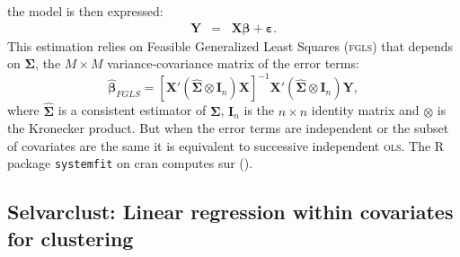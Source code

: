 \documentclass[12pt,a4paper]{report}
\begin{document}
		the model is then expressed:
		\begin{eqnarray}
			\boldsymbol{Y}%
			&=&\boldsymbol{X}\boldsymbol{\beta}+\boldsymbol{\varepsilon}. \nonumber
		\end{eqnarray}
		 This estimation relies on Feasible Generalized Least Squares (\textsc{fgls}) that depends on $\boldsymbol{\Sigma}$, the $M \times M$ variance-covariance matrix of the error terms:
		 \begin{equation}
		 	\hat{\boldsymbol{\beta}}_{FGLS}= [\boldsymbol{X}'(\hat{\boldsymbol{\Sigma}} \otimes \boldsymbol{I}_n)\boldsymbol{X} ]^{-1}\boldsymbol{X}'(\hat{\boldsymbol{\Sigma}} \otimes \boldsymbol{I}_n) \boldsymbol{Y},  \nonumber
\end{equation}		  
		 where $\hat{\boldsymbol{\Sigma}}$ is a consistent estimator of $\boldsymbol{\Sigma}$, $\boldsymbol{I}_n$ is the $n\times n$ identity matrix and $\otimes$ is the Kronecker product.
		 But when the error terms are independent or the subset of covariates are the same it is equivalent to successive independent \textsc{ols}. The R package {\tt systemfit} on {\sc cran} computes {\sc sur} (\cite{packagesystemfit}). 
%			
%
		\subsection{Selvarclust: Linear regression within covariates for clustering}		%
\end{document}
